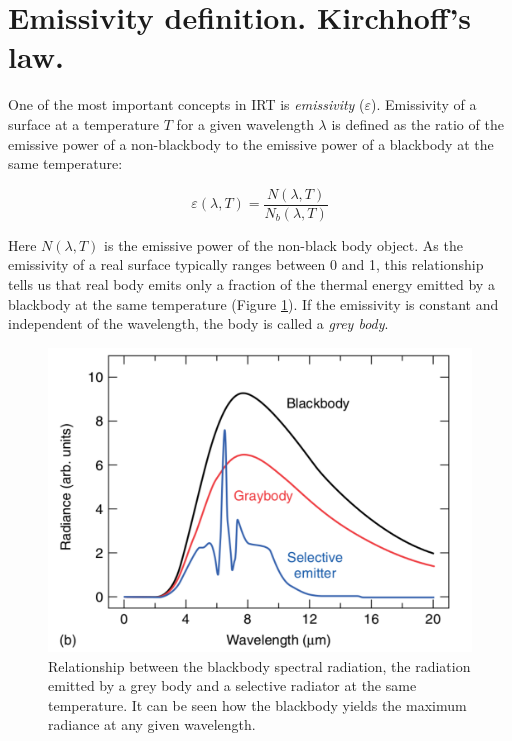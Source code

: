 	\section{Emissivity definition. Kirchhoff's law.}\label{section1.3}
		
		One of the most important concepts in IRT is \textit{emissivity} ($\varepsilon$). Emissivity of a surface at a temperature $T$ for a given wavelength $\lambda$ is defined as the ratio of the emissive power of a  non-blackbody to the emissive power of a blackbody at the same temperature:
		
		\begin{equation}\label{eq1.4}
			\varepsilon(\lambda,T)=\frac{N(\lambda,T)}{N_{b}(\lambda,T)}
		\end{equation}\bigskip
		
		Here $N(\lambda,T)$ is the emissive power of the non-black body object. As the emissivity of a real surface typically ranges between 0 and 1, this relationship tells us that real body emits only a fraction of the thermal energy emitted by a blackbody at the same temperature (Figure \ref{fig1.4}). If the emissivity is constant and independent of the wavelength, the body is called a \textit{grey body}.
		
		\begin{figure}[ht!]
			\centering
			\captionsetup{justification=centering,margin=2cm}
			\includegraphics[scale=0.4]{Figures/Chapter01/BlackAndGreybodyComparison.pdf}
			\caption{Relationship between the blackbody spectral radiation, the radiation emitted by a grey body and a selective radiator at the same temperature. It can be seen how the blackbody yields the maximum radiance at any given wavelength.}\label{fig1.4}
		\end{figure}
		
